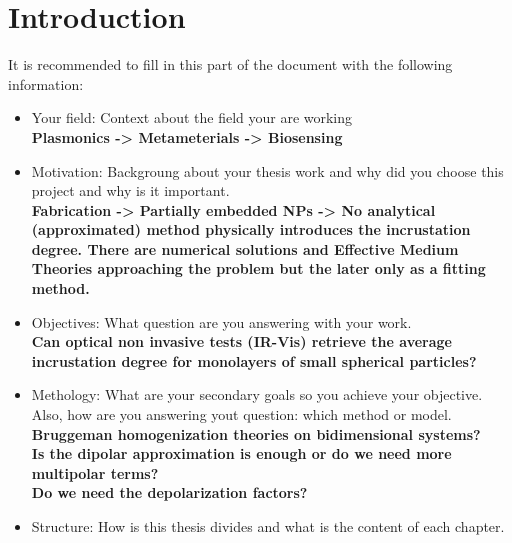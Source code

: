 
\chapter*{Introduction}
\label{chapter:intro}


 It is recommended to fill in this part of the document with the following information:

\begin{itemize}
	\item Your field: Context about the field your are working \\
	\textbf{Plasmonics -> Metameterials -> Biosensing}
	\item Motivation: Backgroung about your thesis work and why did you choose this project and why is it important.\\
	\textbf{Fabrication -> Partially embedded NPs -> No analytical (approximated) method physically introduces the incrustation degree. There are numerical solutions and Effective Medium Theories approaching the problem but the later only as a fitting method. }
	\item Objectives: What question are you answering with your work.\\
	\textbf{Can optical non invasive tests (IR-Vis) retrieve the average incrustation degree for monolayers of small spherical particles?}
	\item Methology: What are your secondary goals so you achieve your objective. Also, how are you answering yout question: which method or model.\\
	\textbf{Bruggeman homogenization theories on bidimensional systems?\\
	Is the dipolar approximation is enough or do we need more multipolar terms?\\
	Do we need the depolarization factors?}
	\item Structure: How is this thesis divides and what is the content of each chapter.
\end{itemize}
